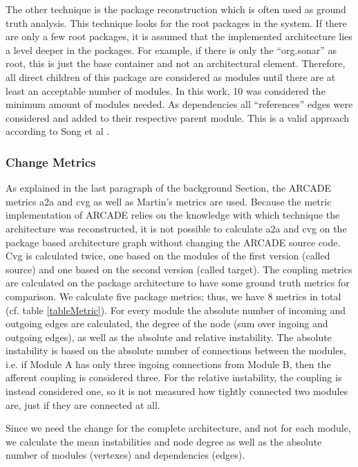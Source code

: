 \documentclass[conference]{IEEEtran}
\begin{document}
The other technique is the package reconstruction which is often used as ground truth analysis.
This technique looks for the root packages in the system. If there are only a few root packages, it is assumed that the implemented architecture lies a level deeper in the packages. For example, if there is only the ``org.sonar'' as root, this is just the base container and not an architectural element. Therefore, all direct children of this package are considered as modules until there are at least an acceptable number of modules. In this work, 10 was considered the minimum amount of modules needed. As dependencies all ``references'' edges were considered and added to their respective parent module. This is a valid approach according to Song et al \cite{ArcAsGraph}. 

\subsubsection{Change Metrics}

As explained in the last paragraph of the background Section, the ARCADE metrics a2a and cvg as well as Martin's metrics are used. Because the metric implementation of ARCADE relies on the knowledge with which technique the architecture was reconstructed, it is not possible to calculate a2a and cvg on the package based architecture graph without changing the ARCADE source code. Cvg is calculated twice, one based on the modules of the first version (called source) and one based on the second version (called target).
The coupling metrics are calculated on the package architecture to have some ground truth metrics for comparison. We calculate five package metrics; thus, we have 8 metrics in total (cf. table \ref{tableMetric}).
For every module the absolute number of incoming and outgoing edges are calculated, the degree of the node (sum over ingoing and outgoing edges), as well as the absolute and relative instability. The absolute instability is based on the absolute number of connections between the modules, i.e. if Module A has only three ingoing connections from Module B, then the afferent coupling is considered three. For the relative instability, the coupling is instead considered one, so it is not measured how tightly connected two modules are, just if they are connected at all.

Since we need the change for the complete architecture, and not for each module, we calculate the mean instabilities and node degree as well as the absolute number of modules (vertexes) and dependencies (edges).
\end{document}
